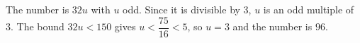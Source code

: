 The number is $ 32u $ with $ u $ odd. Since it is divisible by 3, $ u $ is an odd multiple of 3. The bound $ 32u<150 $ gives $ u<\dfrac{75}{16}<5 $, so $ u=3 $ and the number is $\boxed{96}$.
